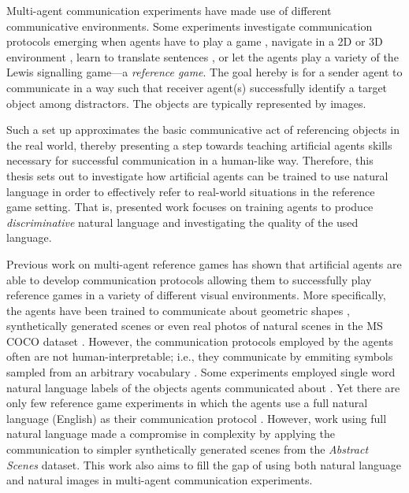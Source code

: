 Multi-agent communication experiments have made use of different communicative environments. Some experiments investigate communication protocols emerging when agents have to play a game \parencite{jacob2021multitasking}, navigate in a 2D or 3D environment \parencite{das2019tarmac, jaques2019social}, learn to translate sentences \parencite{lee2019countering}, or let the agents play a variety of the Lewis signalling game---a \textit{reference game}. The goal hereby is for a sender agent to communicate in a way such that receiver agent(s) successfully identify a target object among distractors. The objects are typically represented by images. 

Such a set up approximates the basic communicative act of referencing objects in the real world, thereby presenting a step towards teaching artificial agents skills necessary for successful communication in a human-like way.
Therefore, this thesis sets out to investigate how artificial agents can be trained to use natural language in order to effectively refer to real-world situations in the reference game setting. That is, presented work focuses on training agents to produce \textit{discriminative} natural language and investigating the quality of the used language. 

Previous work on multi-agent reference games has shown that artificial agents are able to develop communication protocols allowing them to successfully play reference games in a variety of different visual environments. More specifically, the agents have been trained to communicate about geometric shapes \parencite{ohmer2021and}, synthetically generated scenes \parencite{lazaridou2020multi} or even real photos of natural scenes in the MS COCO dataset \parencite{lazaridou2016multi, lin2014microsoft, havrylov2017emergence}. However, the communication protocols employed by the agents often are not human-interpretable; i.e., they communicate by emmiting symbols sampled from an arbitrary vocabulary \parencite{foerster2016learning, lazaridou2016multi}. Some experiments employed single word natural language labels of the objects agents communicated about \parencite{lazaridou2016multi}. Yet there are only few reference game experiments in which the agents use a full natural language (English) as their communication protocol \parencite{lazaridou2020multi}. However, work using full natural language made a compromise in complexity by applying the communication to simpler synthetically generated scenes from the \textit{Abstract Scenes} dataset. This work also aims to fill the gap of using both natural language and natural images in multi-agent communication experiments. 

